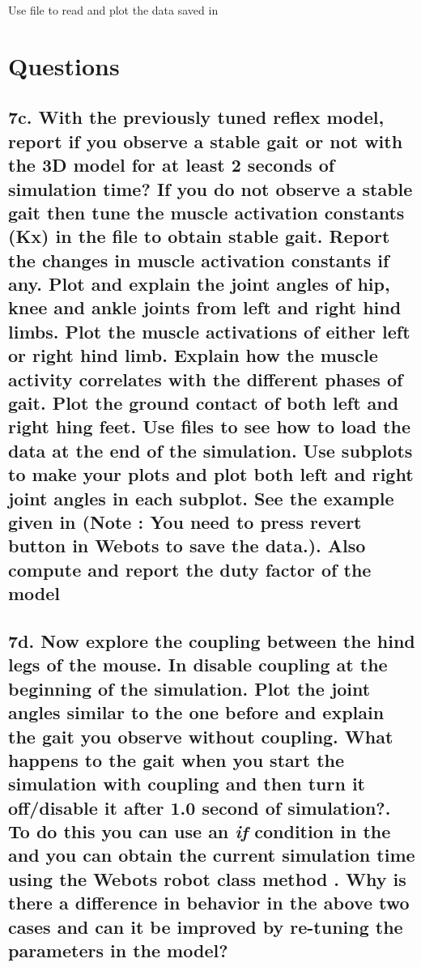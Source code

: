 \documentclass{cmc}
\begin{document}
Use  file to read and plot the data saved
in 

\section*{\textnormal{Questions}}
\label{sec:questions}

\subsection*{7c. With the previously tuned reflex model, report if you
  observe a stable gait or not with the 3D model for at least 2
  seconds of simulation time? If you do not observe a stable gait then
  tune the muscle activation constants (Kx) in the 
  file to obtain stable gait. Report the changes in muscle activation
  constants if any. Plot and explain the joint angles of hip, knee and
  ankle joints from left and right hind limbs. Plot the muscle
  activations of either left or right hind limb. Explain how the
  muscle activity correlates with the different phases of gait. Plot
  the ground contact of both left and right hing feet. Use
   files to see how to load the data at
  the end of the simulation.  Use subplots to make your plots and plot
  both left and right joint angles in each subplot. See the example
  given in  (Note : You need to press
  revert button in Webots to save the data.). Also compute and report
  the duty factor of the model }

\subsection*{7d. Now explore the coupling between the hind legs of the
  mouse. In  disable coupling at the beginning of the
  simulation.  Plot the joint angles similar to the one before and
  explain the gait you observe without coupling. What happens to the
  gait when you start the simulation with coupling and then turn it
  off/disable it after 1.0 second of simulation?.  To do this you can
  use an \textit{if} condition in the  and you can
  obtain the current simulation time using the Webots robot class
  method .  Why is there a difference in behavior
  in the above two cases and can it be improved by re-tuning the
  parameters in the model?}
\end{document}

